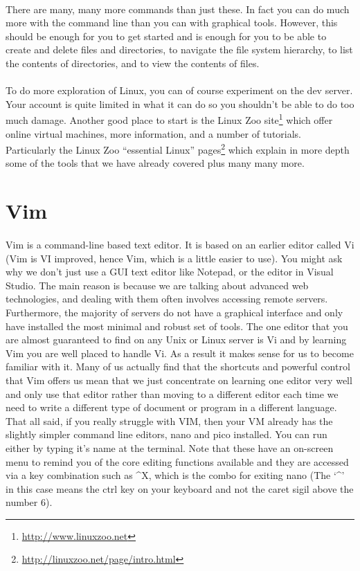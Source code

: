 \documentclass[12pt, a4paper, oneside]{book}
\begin{document}
\paragraph{} There are many, many more commands than just these. In fact you can do much more with the command line than you can with graphical tools. However, this should be enough for you to get started and is enough for you to be able to create and delete files and directories, to navigate the file system hierarchy, to list the contents of directories, and to view the contents of files. 

\paragraph{} To do more exploration of Linux, you can of course experiment on the dev server. Your account is quite limited in what it can do so you shouldn't be able to do too much damage. Another good place to start is the Linux Zoo site\footnote{\url{http://www.linuxzoo.net}} which offer online virtual machines, more information, and a number of tutorials. Particularly the Linux Zoo ``essential Linux'' pages\footnote{\url{http://linuxzoo.net/page/intro.html}} which explain in more depth some of the tools that we have already covered plus many many more.




\section{Vim}
\label{vim}
\paragraph{} Vim is a command-line based text editor. It is based on an earlier editor called Vi (Vim is VI improved, hence Vim, which is a little easier to use). You might ask why we don't just use a GUI text editor like Notepad, or the editor in Visual Studio. The main reason is because we are talking about advanced web technologies, and dealing with them often involves accessing remote servers. Furthermore, the majority of servers do not have a graphical interface and only have installed the most minimal and robust set of tools. The one editor that you are almost guaranteed to find on any Unix or Linux server is Vi and by learning Vim you are well placed to handle Vi. As a result it makes sense for us to become familiar with it. Many of us actually find that the shortcuts and powerful control that Vim offers us mean that we just concentrate on learning one editor very well and only use that editor rather than moving to a different editor each time we need to write a different type of document or program in a different language. That all said, if you really struggle with VIM, then your VM already has the slightly simpler command line editors, nano and pico installed. You can run either by typing it's name at the terminal. Note that these have an on-screen menu to remind you of the core editing functions available and they are accessed via a key combination such as \string^X, which is the combo for exiting nano (The `\string^' in this case means the ctrl key on your keyboard and not the caret sigil above the number 6).
\end{document}
